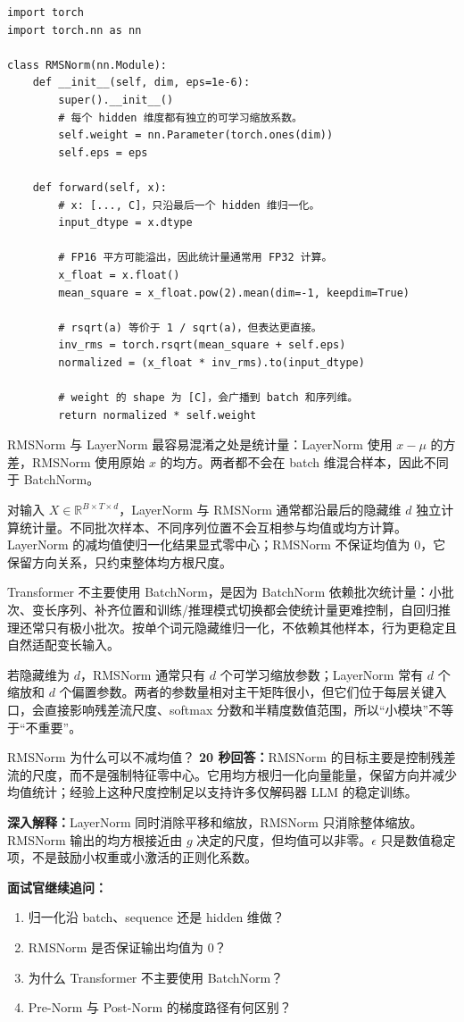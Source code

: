 \begin{lstlisting}
import torch
import torch.nn as nn

class RMSNorm(nn.Module):
    def __init__(self, dim, eps=1e-6):
        super().__init__()
        # 每个 hidden 维度都有独立的可学习缩放系数。
        self.weight = nn.Parameter(torch.ones(dim))
        self.eps = eps

    def forward(self, x):
        # x: [..., C]，只沿最后一个 hidden 维归一化。
        input_dtype = x.dtype

        # FP16 平方可能溢出，因此统计量通常用 FP32 计算。
        x_float = x.float()
        mean_square = x_float.pow(2).mean(dim=-1, keepdim=True)

        # rsqrt(a) 等价于 1 / sqrt(a)，但表达更直接。
        inv_rms = torch.rsqrt(mean_square + self.eps)
        normalized = (x_float * inv_rms).to(input_dtype)

        # weight 的 shape 为 [C]，会广播到 batch 和序列维。
        return normalized * self.weight
\end{lstlisting}

RMSNorm 与 LayerNorm 最容易混淆之处是统计量：LayerNorm 使用 $x-\mu$ 的方差，RMSNorm 使用原始 $x$ 的均方。两者都不会在 batch 维混合样本，因此不同于 BatchNorm。

对输入 $X\in\mathbb R^{B\times T\times d}$，LayerNorm 与 RMSNorm 通常都沿最后的隐藏维 $d$ 独立计算统计量。不同批次样本、不同序列位置不会互相参与均值或均方计算。LayerNorm 的减均值使归一化结果显式零中心；RMSNorm 不保证均值为 $0$，它保留方向关系，只约束整体均方根尺度。

Transformer 不主要使用 BatchNorm，是因为 BatchNorm 依赖批次统计量：小批次、变长序列、补齐位置和训练/推理模式切换都会使统计量更难控制，自回归推理还常只有极小批次。按单个词元隐藏维归一化，不依赖其他样本，行为更稳定且自然适配变长输入。

若隐藏维为 $d$，RMSNorm 通常只有 $d$ 个可学习缩放参数；LayerNorm 常有 $d$ 个缩放和 $d$ 个偏置参数。两者的参数量相对主干矩阵很小，但它们位于每层关键入口，会直接影响残差流尺度、softmax 分数和半精度数值范围，所以“小模块”不等于“不重要”。

\begin{interviewbox}{RMSNorm 为什么可以不减均值？}
\textbf{20 秒回答：}RMSNorm 的目标主要是控制残差流的尺度，而不是强制特征零中心。它用均方根归一化向量能量，保留方向并减少均值统计；经验上这种尺度控制足以支持许多仅解码器 LLM 的稳定训练。

\textbf{深入解释：}LayerNorm 同时消除平移和缩放，RMSNorm 只消除整体缩放。RMSNorm 输出的均方根接近由 $g$ 决定的尺度，但均值可以非零。$\epsilon$ 只是数值稳定项，不是鼓励小权重或小激活的正则化系数。

\textbf{面试官继续追问：}
\begin{enumerate}
  \item 归一化沿 batch、sequence 还是 hidden 维做？
  \item RMSNorm 是否保证输出均值为 $0$？
  \item 为什么 Transformer 不主要使用 BatchNorm？
  \item Pre-Norm 与 Post-Norm 的梯度路径有何区别？
\end{enumerate}
\end{interviewbox}


